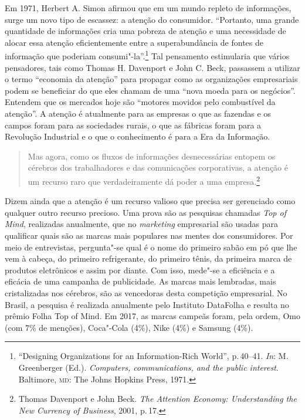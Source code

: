 Em 1971, Herbert A. Simon afirmou que em um mundo repleto de
informações, surge um novo tipo de escassez: a atenção do consumidor.
``Portanto, uma grande quantidade de informações cria uma pobreza de
atenção e uma necessidade de alocar essa atenção eficientemente entre a
superabundância de fontes de informação que poderiam consumi"-la''.\footnote{``Designing Organizations for an Information-Rich World'', p.\,40--41. \textit{In}: M. Greenberger (Ed.). \textit{Computers, communications, and the public interest}. Baltimore, \textsc{md}: The Johns Hopkins Press, 1971.} Tal pensamento estimularia que vários pensadores,
tais como Thomas H. Davenport e John C. Beck, passassem a utilizar o
termo ``economia da atenção'' para propagar como as organizações
empresariais podem se beneficiar do que eles chamam de uma ``nova moeda
para os negócios''. Entendem que os mercados hoje são ``motores movidos
pelo combustível da atenção''. A atenção é atualmente para as empresas o
que as fazendas e os campos foram para as sociedades rurais, o que as
fábricas foram para a Revolução Industrial e o que o conhecimento é para
a Era da Informação.

\begin{quote}
Mas agora, como os fluxos de informações desnecessárias entopem os
cérebros dos trabalhadores e das comunicações corporativas, a atenção é
um recurso raro que verdadeiramente dá poder a uma empresa.\footnote{Thomas Davenport e John Beck. \textit{The Attention Economy:
Understanding the New Currency of Business}, 2001, p.\,17.}
\end{quote}

Dizem ainda que a atenção é um recurso valioso que precisa ser
gerenciado como qualquer outro recurso precioso. Uma prova são as
pesquisas chamadas \textit{Top of Mind}, realizadas anualmente, que no
\textit{marketing} empresarial são usadas para qualificar quais são as
marcas mais populares nas mentes dos consumidores. Por meio de
entrevistas, pergunta"-se qual é o nome do primeiro sabão em pó que lhe
vem à cabeça, do primeiro refrigerante, do primeiro tênis, da primeira
marca de produtos eletrônicos e assim por diante. Com isso, mede"-se a
eficiência e a eficácia de uma campanha de publicidade. As marcas mais
lembradas, mais cristalizadas nos cérebros, são as vencedoras desta
competição empresarial. No Brasil, a pesquisa é realizada anualmente
pelo Instituto DataFolha e resulta no prêmio Folha Top of Mind. Em 2017,
as marcas campeãs foram, pela ordem, Omo (com 7\% de menções), Coca"-Cola
(4\%), Nike (4\%) e Samsung (4\%).


